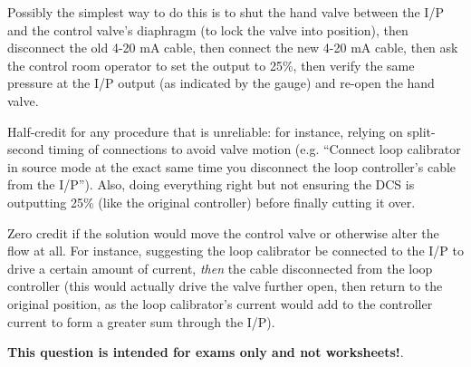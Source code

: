 





Possibly the simplest way to do this is to shut the hand valve between the I/P and the control valve's diaphragm (to lock the valve into position), then disconnect the old 4-20 mA cable, then connect the new 4-20 mA cable, then ask the control room operator to set the output to 25\%, then verify the same pressure at the I/P output (as indicated by the gauge) and re-open the hand valve.

\vskip 10pt

Half-credit for any procedure that is unreliable: for instance, relying on split-second timing of connections to avoid valve motion (e.g. ``Connect loop calibrator in source mode at the exact same time you disconnect the loop controller's cable from the I/P'').  Also, doing everything right but not ensuring the DCS is outputting 25\% (like the original controller) before finally cutting it over.

\vskip 10pt

Zero credit if the solution would move the control valve or otherwise alter the flow at all.  For instance, suggesting the loop calibrator be connected to the I/P to drive a certain amount of current, {\it then} the cable disconnected from the loop controller (this would actually drive the valve further open, then return to the original position, as the loop calibrator's current would add to the controller current to form a greater sum through the I/P).







{\bf This question is intended for exams only and not worksheets!}.



